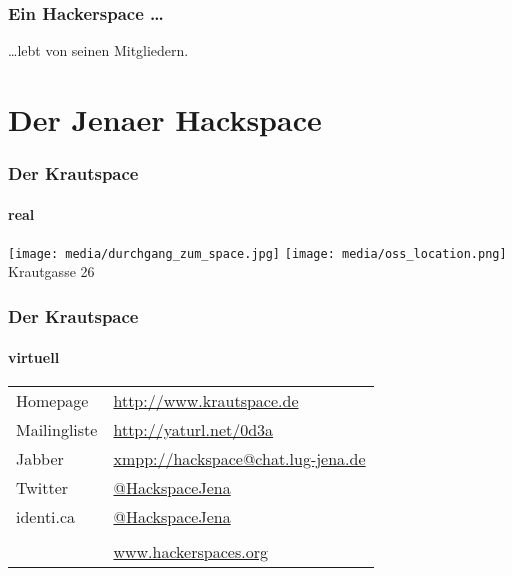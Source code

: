 \documentclass[english,compress,handout]{beamer}
\begin{document}
\begin{center}
\begin{frame}
	\frametitle{Ein Hackerspace \ldots}
	\ldots lebt von seinen Mitgliedern.
\end{frame}


\section{Der Jenaer Hackspace}

\begin{frame}
	\frametitle{Der Krautspace}
	\framesubtitle{real}
	\hspace*{\fill}
	\texttt{[image: media/durchgang\_zum\_space.jpg]}
	\hfill
	\texttt{[image: media/oss\_location.png]}
	\hspace*{\fill}
	\bigskip\\
	Krautgasse 26
\end{frame}

\begin{frame}
	\frametitle{Der Krautspace}
	\framesubtitle{virtuell}
	\begin{center}
		\begin{tabular}{ll}
			Homepage & \url{http://www.krautspace.de}\\
			Mailingliste & \url{http://yaturl.net/0d3a}\\
			Jabber & \url{xmpp://hackspace@chat.lug-jena.de}\\
			Twitter & \url{@HackspaceJena}\\
			identi.ca & \url{@HackspaceJena}\\
			\\
			& \url{www.hackerspaces.org}\\
		\end{tabular}
	\end{center}
\end{frame}

\end{center}
\end{document}
